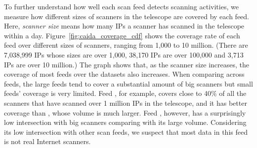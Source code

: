 
\begin{table}
\small
\caption{Intersection between scan feeds and telescope scanners.
\textit{Volume} contains the total amount of IPs in each feed from
Jan. 2016 to July 2016. \textit{Intersection} is the proportion
of each feed's IPs that overlap with the telescope data.}
\centering
\label{tab:caida_ip_overlap}
\end{table}

To further understand how well each scan feed detects scanning
activities, we measure how different sizes of scanners in the
telescope are covered by each feed. Here, \emph{scanner size} means how
many IPs a scanner has scanned in the telescope within a
day. Figure~\ref{fig:caida_coverage_cdf} shows the coverage rate of
each feed over different sizes of scanners, ranging from 1,000 to 10
million. (There are 7,038,999 IPs whose sizes are over 1,000, 38,170
IPs are over 100,000 and 3,713 IPs are over 10 million.) The graph
shows that, as the scanner size increases, the coverage of most feeds
over the datasets also increases. When comparing across feeds, the
large feeds tend to cover a substantial amount of big scanners but
small feeds' coverage is very limited. Feed {\feedpacketmail}, for
example, covers close to 40\% of all the scanners that have scanned
over 1 million IPs in the telescope, and it has better coverage than
{\feedetiprep}, whose volume is much larger. Feed {\feedTSSnort},
however, has a surprisingly low intersection with big scanners
comparing with its large volume. Considering its low intersection with
other scan feeds, we suspect that most data in this feed is not real
Internet scanners.

